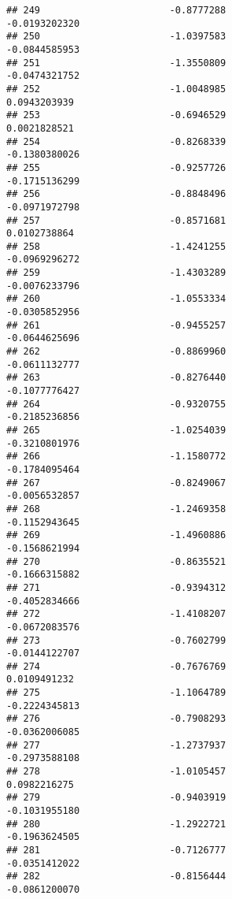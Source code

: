 \documentclass[
]{article}
\begin{document}
\begin{verbatim}
## 249                       -0.8777288                         -0.0193202320
## 250                       -1.0397583                         -0.0844585953
## 251                       -1.3550809                         -0.0474321752
## 252                       -1.0048985                          0.0943203939
## 253                       -0.6946529                          0.0021828521
## 254                       -0.8268339                         -0.1380380026
## 255                       -0.9257726                         -0.1715136299
## 256                       -0.8848496                         -0.0971972798
## 257                       -0.8571681                          0.0102738864
## 258                       -1.4241255                         -0.0969296272
## 259                       -1.4303289                         -0.0076233796
## 260                       -1.0553334                         -0.0305852956
## 261                       -0.9455257                         -0.0644625696
## 262                       -0.8869960                         -0.0611132777
## 263                       -0.8276440                         -0.1077776427
## 264                       -0.9320755                         -0.2185236856
## 265                       -1.0254039                         -0.3210801976
## 266                       -1.1580772                         -0.1784095464
## 267                       -0.8249067                         -0.0056532857
## 268                       -1.2469358                         -0.1152943645
## 269                       -1.4960886                         -0.1568621994
## 270                       -0.8635521                         -0.1666315882
## 271                       -0.9394312                         -0.4052834666
## 272                       -1.4108207                         -0.0672083576
## 273                       -0.7602799                         -0.0144122707
## 274                       -0.7676769                          0.0109491232
## 275                       -1.1064789                         -0.2224345813
## 276                       -0.7908293                         -0.0362006085
## 277                       -1.2737937                         -0.2973588108
## 278                       -1.0105457                          0.0982216275
## 279                       -0.9403919                         -0.1031955180
## 280                       -1.2922721                         -0.1963624505
## 281                       -0.7126777                         -0.0351412022
## 282                       -0.8156444                         -0.0861200070

\end{verbatim}
\end{document}
